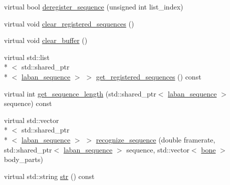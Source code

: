 \begin{DoxyCompactItemize}
virtual bool \hyperlink{classmae_1_1fl_1_1laban_1_1laban__sequence__recognizer_ac3fb568e668228472ea3a1ff0124898e}{deregister\-\_\-sequence} (unsigned int list\-\_\-index)
\item 
virtual void \hyperlink{classmae_1_1fl_1_1laban_1_1laban__sequence__recognizer_a4eaa30d1cd8064e381765a2b3385a248}{clear\-\_\-registered\-\_\-sequences} ()
\item 
virtual void \hyperlink{classmae_1_1fl_1_1laban_1_1laban__sequence__recognizer_a7f5d977323284c197dfe21a5d34e9d35}{clear\-\_\-buffer} ()
\item 
virtual std\-::list\\*
$<$ std\-::shared\-\_\-ptr\\*
$<$ \hyperlink{classmae_1_1fl_1_1laban_1_1laban__sequence}{laban\-\_\-sequence} $>$ $>$ \hyperlink{classmae_1_1fl_1_1laban_1_1laban__sequence__recognizer_a5943813eff1aa8d316c0b2e4b3447a78}{get\-\_\-registered\-\_\-sequences} () const 
\item 
virtual int \hyperlink{classmae_1_1fl_1_1laban_1_1laban__sequence__recognizer_a3ef80c6bdb2f7478a6940d74cbfb33cb}{get\-\_\-sequence\-\_\-length} (std\-::shared\-\_\-ptr$<$ \hyperlink{classmae_1_1fl_1_1laban_1_1laban__sequence}{laban\-\_\-sequence} $>$ sequence) const 
\item 
virtual std\-::vector\\*
$<$ std\-::shared\-\_\-ptr\\*
$<$ \hyperlink{classmae_1_1fl_1_1laban_1_1laban__sequence}{laban\-\_\-sequence} $>$ $>$ \hyperlink{classmae_1_1fl_1_1laban_1_1laban__sequence__recognizer_a585dc721196e18e76e396d16f609d072}{recognize\-\_\-sequence} (double framerate, std\-::shared\-\_\-ptr$<$ \hyperlink{classmae_1_1fl_1_1laban_1_1laban__sequence}{laban\-\_\-sequence} $>$ sequence, std\-::vector$<$ \hyperlink{classmae_1_1bone}{bone} $>$ body\-\_\-parts)
\item 
virtual std\-::string \hyperlink{classmae_1_1fl_1_1laban_1_1laban__sequence__recognizer_af411c388147b6945827ab7fdd47ce131}{str} () const 
\end{DoxyCompactItemize}


